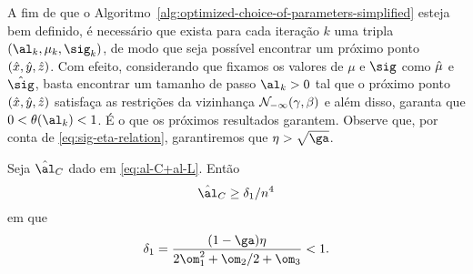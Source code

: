 A fim de que o Algoritmo~\ref{alg:optimized-choice-of-parameters-simplified} esteja bem definido, é necessário que exista para cada iteração $k$ uma tripla $(\al_k,\mu_k,\sig_k)$, de modo que seja possível encontrar um próximo ponto $(\hat{x},\hat{y},\hat{z})$. Com efeito, considerando que fixamos os valores de $\mu$ e $\sig$ como $\hat{\mu} $ e  $\nextsig$, basta encontrar um  tamanho de passo ${\al_k}>0$ tal que o próximo ponto $(\hat{x},\hat{y},\hat{z})$ satisfaça as restrições da vizinhança 
$\mathcal{N}_{-\infty}(\gamma,\beta)$ e além disso, garanta que  $0 < \theta(\al_k) <1$. É o que os próximos resultados garantem. Observe que, por conta de \eqref{eq:sig-eta-relation}, garantiremos que $\eta>\sqrt{\ga}$.



\begin{lema}\label{lemma:alC_delta-1}
Seja $\nextal_{C}$ dado em \eqref{eq:al-C+al-L}. Então 
\[
\nextal_{C} \geq \delta_{1}/n^{4}
\]
em que 
\[
\delta_{1} = \dfrac{(1-\ga)\eta}{2\om_{1}^{2} + \om_{2}/2 + \om_{3}  } < 1.
\]
\end{lema}

